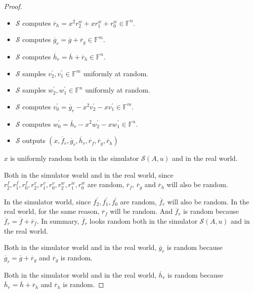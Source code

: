 \begin{proof}
\begin{itemize}
    \item $\mathcal{S}$ computes $\overline{r}_h = x^2 r_2^w + x r_1^w + r_0^w \in \mathbb{F}^n$.
    
    \item $\mathcal{S}$ computes $\overline{g}_r = \overline{g} + \overline{r}_g \in \mathbb{F}^m$.
    
    \item $\mathcal{S}$ computes $\overline{h}_r = \overline{h} + \overline{r}_h \in \mathbb{F}^n$.

    \item $\mathcal{S}$ samples $v_2^\prime, v_1^\prime \in \mathbb{F}^m$ uniformly at random.
    
    \item $\mathcal{S}$ samples $w_2^\prime, w_1^\prime \in \mathbb{F}^n$ uniformly at random.
    
    \item $\mathcal{S}$ computes $v_0^\prime = \overline{g}_r - x^2 v_2^\prime - x v_1^\prime \in \mathbb{F}^m$.

    \item $\mathcal{S}$ computes $w_0^\prime = \overline{h}_r - x^2 w_2^\prime - x w_1^\prime \in \mathbb{F}^n$.
    
    \item $\mathcal{S}$ outputs $(x, \overline{f}_r, \overline{g}_r, \overline{h}_r, \overline{r}_f, \overline{r}_g, \overline{r}_h)$
\end{itemize}

$x$ is uniformly random both in the simulator $\mathcal{S}(A, u)$ and in the real world. 

Both in the simulator world and in the real world, since $r_2^f, r_1^f, r_0^f, r_2^v, r_1^v, r_0^v, r_2^w, r_1^w, r_0^w$ are random, $\overline{r}_f$, $\overline{r}_g$ and $\overline{r}_h$ will also be random.

In the simulator world, since $f_2^\prime, f_1^\prime, f_0^\prime$ are random, $\overline{f}_r$ will also be random. In the real world, for the same reason, $\overline{r}_f$ will be random. And $\overline{f}_r$ is random because $\overline{f}_r = \overline{f} + \overline{r}_f$. In summary, $\overline{f}_r$ looks random both in the simulator $\mathcal{S}(A, u)$ and in the real world. 

Both in the simulator world and in the real world, $\overline{g}_r$ is random because $\overline{g}_r = \overline{g} + \overline{r}_g$ and $\overline{r}_g$ is random.

Both in the simulator world and in the real world, $\overline{h}_r$ is random because $\overline{h}_r = \overline{h} + \overline{r}_h$ and $\overline{r}_h$ is random.


\end{proof}
